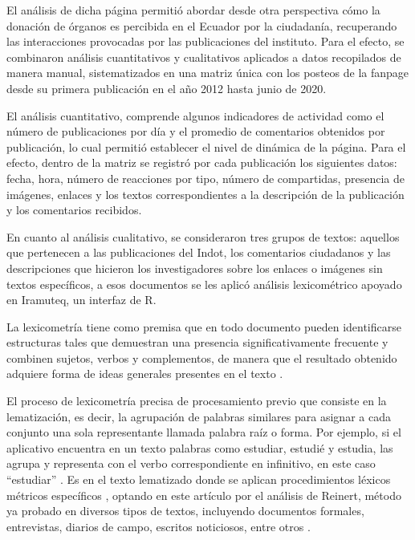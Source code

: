 \documentclass[spanish]{textolivre}
\begin{document}
El análisis de dicha página permitió abordar desde otra perspectiva cómo la donación de órganos es percibida en el Ecuador por la ciudadanía, recuperando las interacciones provocadas por las publicaciones del instituto. Para el efecto, se combinaron análisis cuantitativos y cualitativos aplicados a datos recopilados de manera manual, sistematizados en una matriz única con los posteos de la fanpage desde su primera publicación en el año 2012 hasta junio de 2020.

El análisis cuantitativo, comprende algunos indicadores de actividad como el número de publicaciones por día y el promedio de comentarios obtenidos por publicación, lo cual permitió establecer el nivel de dinámica de la página. Para el efecto, dentro de la matriz se registró por cada publicación los siguientes datos: fecha, hora, número de reacciones por tipo, número de compartidas, presencia de imágenes, enlaces y los textos correspondientes a la descripción de la publicación y los comentarios recibidos.

En cuanto al análisis cualitativo, se consideraron tres grupos de textos: aquellos que pertenecen a las publicaciones del Indot, los comentarios ciudadanos y las descripciones que hicieron los investigadores sobre los enlaces o imágenes sin textos específicos, a esos documentos se les aplicó análisis lexicométrico apoyado en Iramuteq, un interfaz de R. 

La lexicometría tiene como premisa que en todo documento pueden identificarse estructuras tales que demuestran una presencia significativamente frecuente y combinen sujetos, verbos y complementos, de manera que el resultado obtenido adquiere forma de ideas generales presentes en el texto \cite{morales_del_rio2019}.  

El proceso de lexicometría precisa de procesamiento previo que consiste en la lematización, es decir, la agrupación de palabras similares para asignar a cada conjunto una sola representante llamada palabra raíz o forma. Por ejemplo, si el aplicativo encuentra en un texto palabras como estudiar, estudié y estudia, las agrupa y representa con el verbo correspondiente en infinitivo, en este caso “estudiar” \cite[p. 9]{ruiz_bueno2016}. Es  en el texto lematizado donde se aplican procedimientos léxicos métricos específicos \cite{molinaneira2017}, optando en este artículo por el análisis de Reinert, método ya probado en diversos tipos de textos, incluyendo documentos formales, entrevistas, diarios de campo, escritos noticiosos, entre otros \cite{de_alba2004}. 
\end{document}
